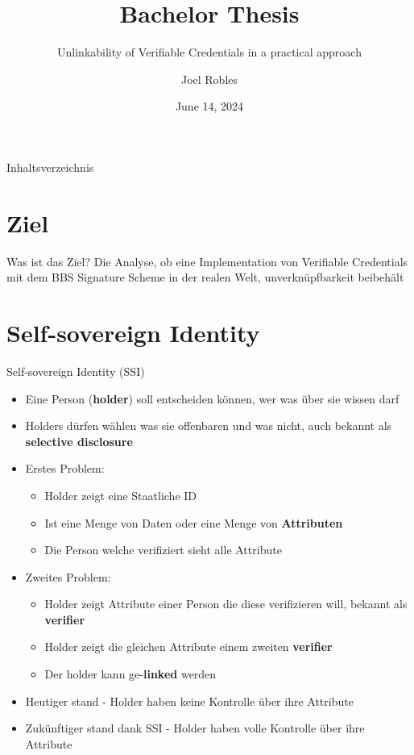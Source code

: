 \documentclass[
	ngerman,%
	authorontitle=true,
	]{bfhbeamer}
\title{Bachelor Thesis}
\subtitle{Unlinkability of Verifiable Credentials in a practical approach}
\author[J. Robles]{Joel Robles}
\institute{TI}
\date{June 14, 2024}
\begin{document}
\maketitle

\begin{frame}{Inhaltsverzeichnis}
    \tableofcontents
\end{frame}

\section{Ziel}

\begin{frame}{Was ist das Ziel?}
    \centering
    Die Analyse, ob eine Implementation von Verifiable Credentials mit dem BBS Signature Scheme in der realen Welt, unverknüpfbarkeit beibehält
\end{frame}

\section{Self-sovereign Identity}

\begin{frame}{Self-sovereign Identity (SSI)}
    \begin{itemize}
        \item Eine Person (\textbf{holder}) soll entscheiden können, wer was über sie wissen darf
        \item Holders dürfen wählen was sie offenbaren und was nicht, auch bekannt als \textbf{selective disclosure}
        \item Erstes Problem:
        \begin{itemize}
            \item Holder zeigt eine Staatliche ID
            \item Ist eine Menge von Daten oder eine Menge von \textbf{Attributen}
            \item Die Person welche verifiziert sieht alle Attribute
        \end{itemize}
        \item Zweites Problem:
        \begin{itemize}
            \item Holder zeigt Attribute einer Person die diese verifizieren will, bekannt als \textbf{verifier}
            \item Holder zeigt die gleichen Attribute einem zweiten \textbf{verifier}
            \item Der holder kann ge-\textbf{linked} werden
        \end{itemize}
        \item Heutiger stand - Holder haben keine Kontrolle über ihre Attribute
        \item Zukünftiger stand dank SSI - Holder haben volle Kontrolle über ihre Attribute
    \end{itemize}
\end{frame}
\end{document}
